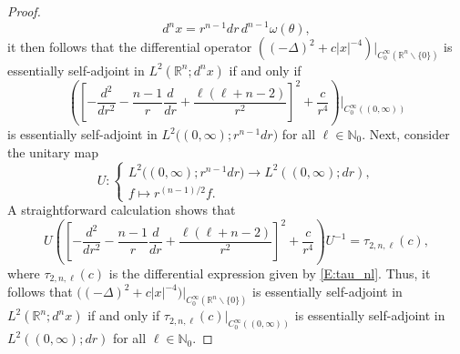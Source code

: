 \documentclass[reqno,11pt,centertags]{amsart}
\newcommand{\bbN}{{\mathbb{N}}}
\newcommand{\bbR}{{\mathbb{R}}}
\newcommand{\<}{\langle}
\renewcommand{\>}{\rangle}
\numberwithin{equation}{section}
\theoremstyle{definition}
\begin{document}
\begin{proof}
\begin{equation}
d^nx = r^{n-1} dr\, d^{n-1}\omega(\theta),
\end{equation}
it then follows that the differential operator   $\left((-\Delta)^2 +c|x|^{-4}\right)\big|_{C_0^{\infty}(\bbR^n \backslash \{0\})}$  is essentially self-adjoint
in $L^2(\bbR^n; d^nx)$ if and only if
\begin{equation}
 \left(\left[- \frac{d^2}{dr^2} - \frac{n-1}{r}\frac{d}{dr} + \frac{\ell (\ell + n - 2)}{r^2}\right]^2 +\frac{c}{r^4}\right)\Bigg|_{C_0^{\infty}((0,\infty))}
\end{equation}
is essentially self-adjoint in $L^2\big((0,\infty); r^{n-1}dr\big)$  for all $\ell\in \bbN_0$.
Next, consider the unitary map  
\begin{equation}
U: \begin{cases} L^2\big((0,\infty); r^{n-1}dr\big) \to  L^2((0,\infty);  dr), \\
f \mapsto r^{(n-1)/2} f. 
\end{cases} 
\end{equation}
A straightforward calculation shows that 
\begin{equation}
U \left(\left[- \frac{d^2}{dr^2} - \frac{n-1}{r}\frac{d}{dr} + \frac{\ell (\ell+ n - 2)}{r^2}\right]^2 +\frac{c}{r^4}\right)U^{-1} = \tau_{2,n,\ell}(c),
\end{equation}
where  $\tau_{2,n,\ell}(c)$ is the differential expression given by \eqref{E:tau_nl}.
Thus, it follows that  $\big((-\Delta)^2 +c|x|^{-4}\big)\big|_{C_0^{\infty}(\bbR^n \backslash \{0\})}$  is essentially self-adjoint in $L^2(\bbR^n; d^n x)$ if and only if $\tau_{2,n,\ell}(c)\big|_{C_0^{\infty}((0,\infty))}$   is essentially self-adjoint in $L^2((0,\infty);  dr)$
for all $\ell\in \bbN_0$.
\end{proof}
\end{document}
